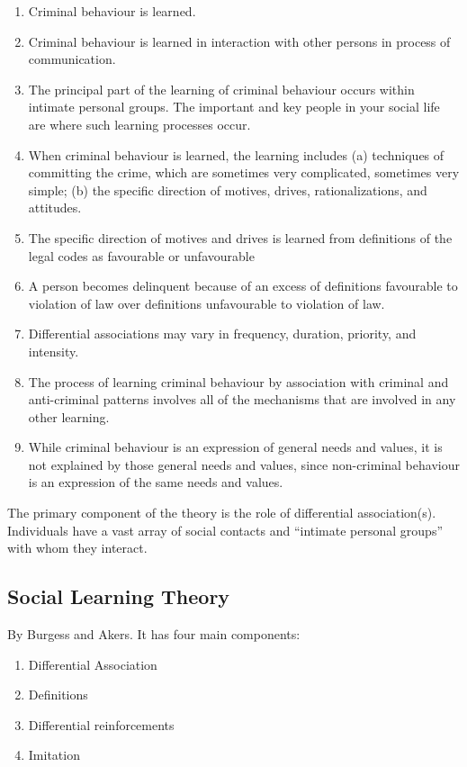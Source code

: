 \documentclass[11pt]{article}
\begin{document}
\begin{enumerate}
    \item Criminal behaviour is learned.
    \item Criminal behaviour is learned in interaction with other persons in process of communication.
    \item The principal part of the learning of criminal behaviour occurs within intimate personal groups. The important and key people in your social life are where such learning processes occur.
    \item When criminal behaviour is learned, the learning includes (a) techniques of committing the crime, which are sometimes very complicated, sometimes very simple; (b) the specific direction of motives, drives, rationalizations, and attitudes.
    \item The specific direction of motives and drives is learned from definitions of the legal codes as favourable or unfavourable
    \item A person becomes delinquent because of an excess of definitions favourable to violation of law over definitions unfavourable to violation of law.
    \item Differential associations may vary in frequency, duration, priority, and intensity.
    \item The process of learning criminal behaviour by association with criminal and anti-criminal patterns involves all of the mechanisms that are involved in any other learning.
    \item While criminal behaviour is an expression of general needs and values, it is not explained by those general needs and values, since non-criminal behaviour is an expression of the same needs and values.
\end{enumerate}

The primary component of the theory is the role of differential association(s). Individuals have a vast array of social contacts and “intimate personal groups” with whom they interact.

\subsection{Social Learning Theory}
By Burgess and Akers. It has four main components:

\begin{enumerate}
    \item Differential Association
    \item Definitions
    \item Differential reinforcements
    \item Imitation
\end{enumerate}
\end{document}
